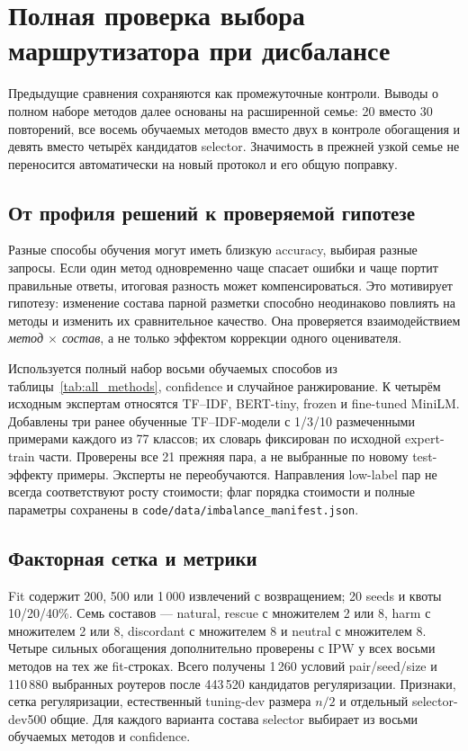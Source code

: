 \section{Полная проверка выбора маршрутизатора при дисбалансе}
Предыдущие сравнения сохраняются как промежуточные контроли.
Выводы о полном наборе методов далее основаны на расширенной семье:
20 вместо 30 повторений, все восемь обучаемых методов вместо двух
в контроле обогащения и девять вместо четырёх кандидатов selector.
Значимость в прежней узкой семье не переносится автоматически
на новый протокол и его общую поправку.
\subsection{От профиля решений к проверяемой гипотезе}
Разные способы обучения могут иметь близкую accuracy, выбирая разные
запросы. Если один метод одновременно чаще спасает ошибки и чаще
портит правильные ответы, итоговая разность может компенсироваться.
Это мотивирует гипотезу: изменение состава парной разметки способно
неодинаково повлиять на методы и изменить их сравнительное качество.
Она проверяется взаимодействием \emph{метод $\times$ состав},
а не только эффектом коррекции одного оценивателя.

Используется полный набор восьми обучаемых способов
из таблицы~\ref{tab:all_methods}, confidence и случайное ранжирование.
К четырём исходным экспертам относятся TF--IDF, BERT-tiny, frozen
и fine-tuned MiniLM. Добавлены три ранее обученные TF--IDF-модели
с 1/3/10 размеченными примерами каждого из 77 классов; их словарь
фиксирован по исходной expert-train части. Проверены все 21 прежняя
пара, а не выбранные по новому test-эффекту примеры.
Эксперты не переобучаются. Направления low-label пар не всегда
соответствуют росту стоимости; флаг порядка стоимости и полные
параметры сохранены в \texttt{code/data/imbalance\_manifest.json}.

\subsection{Факторная сетка и метрики}
Fit содержит 200, 500 или 1\,000 извлечений с возвращением;
20 seeds и квоты 10/20/40\%. Семь составов --- natural,
rescue с множителем 2 или 8, harm с множителем 2 или 8,
discordant с множителем 8 и neutral с множителем 8.
Четыре сильных обогащения дополнительно проверены с IPW
у всех восьми методов на тех же fit-строках.
Всего получены 1\,260 условий pair/seed/size и 110\,880 выбранных
роутеров после 443\,520 кандидатов регуляризации.
Признаки, сетка регуляризации, естественный tuning-dev размера $n/2$
и отдельный selector-dev500 общие. Для каждого варианта состава
selector выбирает из восьми обучаемых методов и confidence.


